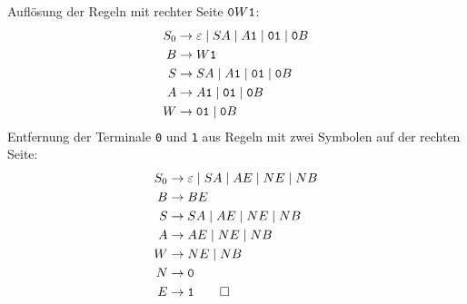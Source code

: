 \begin{loesung}
Auflösung der Regeln mit rechter Seite ${\tt 0}W{\tt 1}$:
\begin{align*}
S_0&\to \varepsilon\;|\;SA\;|\;A{\tt 1}\;|\;{\tt 01}\;|\;{\tt 0}B\\
B  &\to W{\tt 1}\\
S  &\to SA\;|\;A{\tt 1}\;|\;{\tt 01}\;|\;{\tt 0}B\\
A  &\to A{\tt 1}\;|\;{\tt 01}\;|\;{\tt 0}B\\
W  &\to {\tt 01}\;|\; {\tt 0}B
\end{align*}
Entfernung der Terminale {\tt 0} und {\tt 1} aus Regeln mit zwei Symbolen
auf der rechten Seite:
\begin{align*}
S_0&\to \varepsilon\;|\;SA\;|\;AE\;|\;NE\;|\;NB\\
B  &\to BE\\
S  &\to SA\;|\;AE\;|\;NE\;|\;NB\\
A  &\to AE\;|\;NE\;|\;NB\\
W  &\to NE\;|\; NB\\
N  &\to {\tt 0}\\
E  &\to {\tt 1}
\qedhere
\end{align*}
\end{loesung}

